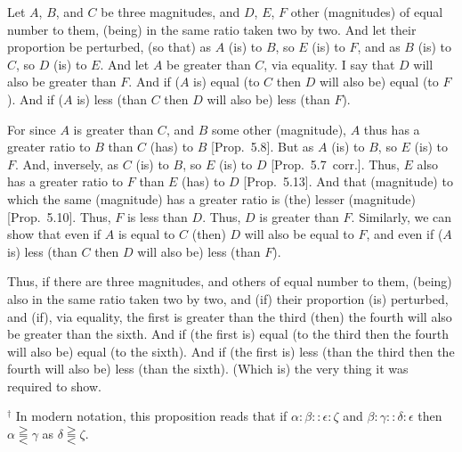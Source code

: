 \begin{Parallel}{}{}
{\epsfysize=0.7in
\centerline{}

Let $A$, $B$, and $C$ be three magnitudes, and $D$, $E$, $F$ other (magnitudes)
of equal number to them, (being) in the same ratio taken two by two. And let their proportion be perturbed, (so that) as $A$ (is) to $B$, so $E$ (is) to $F$, and as
$B$ (is) to $C$, so $D$ (is) to $E$. And let $A$  be greater than $C$, via equality. I
say that $D$ will also be greater than $F$.
 And if ($A$ is) equal (to $C$ then $D$ will also be) equal (to $F$). And
if ($A$ is) less (than $C$ then $D$ will also be) less (than $F$).

For since $A$ is greater than $C$, and $B$ some other (magnitude),  $A$ thus
has a greater ratio to $B$ than $C$ (has) to $B$ [Prop.~5.8]. But as $A$ (is) to $B$,
so $E$ (is) to $F$. And, inversely, as $C$ (is) to $B$, so $E$ (is) to $D$ [Prop.~5.7~corr.]. Thus, $E$ also has a greater
ratio to $F$ than $E$ (has) to $D$ [Prop.~5.13]. And that (magnitude) to which the same (magnitude)  has a greater ratio  is (the) lesser (magnitude) [Prop.~5.10].
Thus, $F$ is less than $D$. Thus, $D$ is greater than $F$. Similarly, we can show that
even if $A$ is equal to $C$ (then) $D$ will also
be equal to $F$, and even if ($A$ is) less (than $C$ then $D$ will also
be) less (than $F$).

Thus, if there are three magnitudes, and others of equal
 number to them, (being) also in the same ratio taken two by two, and (if)
their proportion (is) perturbed, and (if), via equality,
the first is greater than the third (then) the fourth will also
be greater than the sixth. And if (the first is) equal (to the third then the fourth
will also be) equal (to the sixth).
And if (the first is) less (than the third then the fourth will also be) less (than
the sixth). (Which is) the very thing it was required to show.}
\end{Parallel}
{\footnotesize \noindent$^\dag$ In modern notation, this proposition
reads that if $\alpha:\beta::\epsilon:\zeta$ and $\beta:\gamma::\delta:\epsilon$ then $\alpha\gtreqqless\gamma$ as $\delta\gtreqqless\zeta$.}

